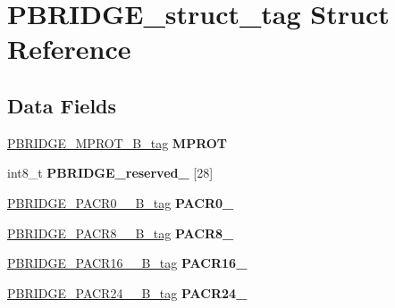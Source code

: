 \hypertarget{structPBRIDGE__struct__tag}{}\section{P\+B\+R\+I\+D\+G\+E\+\_\+struct\+\_\+tag Struct Reference}
\label{structPBRIDGE__struct__tag}
\subsection*{Data Fields}
\begin{DoxyCompactItemize}
\item 
\mbox{\label{structPBRIDGE__struct__tag_a7bb9a51c9948b28f2795a59e5a941ae7}} 
\mbox{\hyperlink{unionPBRIDGE__MPROT__32B__tag}{P\+B\+R\+I\+D\+G\+E\+\_\+\+M\+P\+R\+O\+T\+\_\+B\+\_\+tag}} {\bfseries M\+P\+R\+OT}
\item 
\mbox{\label{structPBRIDGE__struct__tag_a5fe6c643f9ccdfb26a58fa812f09e60b}} 
int8\+\_\+t {\bfseries P\+B\+R\+I\+D\+G\+E\+\_\+reserved\+\_} \mbox{[}28\mbox{]}
\item 
\mbox{\label{structPBRIDGE__struct__tag_a2b3edb8e97554c90833956234cea1bd7}} 
\mbox{\hyperlink{unionPBRIDGE__PACR0__7__32B__tag}{P\+B\+R\+I\+D\+G\+E\+\_\+\+P\+A\+C\+R0\+\_\+\_\+B\+\_\+tag}} {\bfseries P\+A\+C\+R0\+\_}
\item 
\mbox{\label{structPBRIDGE__struct__tag_af5cd44b0907a923ef2a80bccff6aec8c}} 
\mbox{\hyperlink{unionPBRIDGE__PACR8__15__32B__tag}{P\+B\+R\+I\+D\+G\+E\+\_\+\+P\+A\+C\+R8\+\_\+\_\+B\+\_\+tag}} {\bfseries P\+A\+C\+R8\+\_}
\item 
\mbox{\label{structPBRIDGE__struct__tag_aa0eb7896d85a9ff1eca0c239677a61f0}} 
\mbox{\hyperlink{unionPBRIDGE__PACR16__23__32B__tag}{P\+B\+R\+I\+D\+G\+E\+\_\+\+P\+A\+C\+R16\+\_\+\_\+B\+\_\+tag}} {\bfseries P\+A\+C\+R16\+\_}
\item 
\mbox{\label{structPBRIDGE__struct__tag_aee2a88ba6e64615c61a44fccd6ce2dde}} 
\mbox{\hyperlink{unionPBRIDGE__PACR24__31__32B__tag}{P\+B\+R\+I\+D\+G\+E\+\_\+\+P\+A\+C\+R24\+\_\+\_\+B\+\_\+tag}} {\bfseries P\+A\+C\+R24\+\_}

\end{DoxyCompactItemize}
